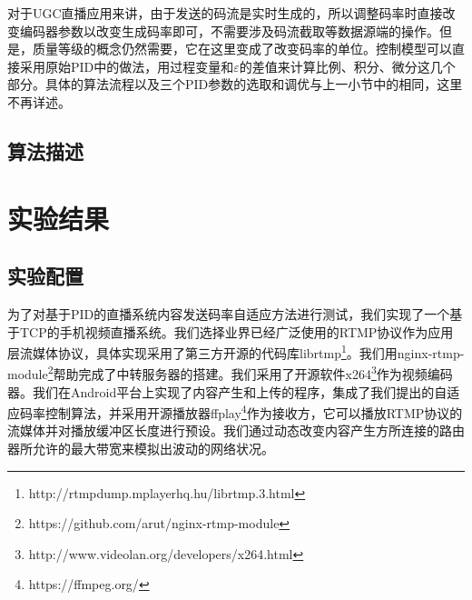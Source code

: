 对于UGC直播应用来讲，由于发送的码流是实时生成的，所以调整码率时直接改变编码器参数以改变生成码率即可，不需要涉及码流截取等数据源端的操作。但是，质量等级的概念仍然需要，它在这里变成了改变码率的单位。控制模型可以直接采用原始PID中的做法，用过程变量和$\varepsilon$的差值来计算比例、积分、微分这几个部分。具体的算法流程以及三个PID参数的选取和调优与上一小节中的相同，这里不再详述。

\subsection{算法描述}

\section{实验结果}

\subsection{实验配置}

为了对基于PID的直播系统内容发送码率自适应方法进行测试，我们实现了一个基于TCP的手机视频直播系统。我们选择业界已经广泛使用的RTMP协议作为应用层流媒体协议，具体实现采用了第三方开源的代码库librtmp\footnote{http://rtmpdump.mplayerhq.hu/librtmp.3.html}。我们用nginx-rtmp-module\footnote{https://github.com/arut/nginx-rtmp-module}帮助完成了中转服务器的搭建。我们采用了开源软件x264\footnote{http://www.videolan.org/developers/x264.html}作为视频编码器。我们在Android平台上实现了内容产生和上传的程序，集成了我们提出的自适应码率控制算法，并采用开源播放器ffplay\footnote{https://ffmpeg.org/}作为接收方，它可以播放RTMP协议的流媒体并对播放缓冲区长度进行预设。我们通过动态改变内容产生方所连接的路由器所允许的最大带宽来模拟出波动的网络状况。

